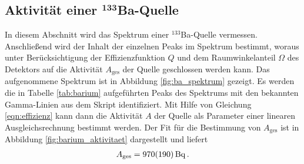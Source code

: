 \subsection[Aktivität einer $^{133}$Ba-Quelle]{Aktivität einer $\mathbf{^{133}}$Ba-Quelle} %
\label{sub:ba_quelle}
In diesem Abschnitt wird das Spektrum einer $^{133}$Ba-Quelle vermessen.
Anschließend wird der Inhalt der einzelnen Peaks im Spektrum bestimmt,
woraus unter Berücksichtigung der Effizienzfunktion $Q$ und dem
Raumwinkelanteil $\Omega$ des Detektors auf die Aktivität $A_\text{ges}$
der Quelle geschlossen werden kann.
Das aufgenommene Spektrum ist in Abbildung \ref{fig:ba_spektrum} gezeigt.
Es werden die in Tabelle \ref{tab:barium} aufgeführten Peaks des Spektrums
mit den bekannten Gamma-Linien aus dem Skript identifiziert.
Mit Hilfe von Gleichung \eqref{eqn:effizienz} kann dann die Aktivität $A$
der Quelle als Parameter einer linearen Ausgleichsrechnung bestimmt werden.
Der Fit für die Bestimmung von $A_\text{ges}$ ist in Abbildung
\ref{fig:barium_aktivitaet} dargestellt und liefert
\begin{align*}
    A_\text{ges} = \SI{970+-190}{\becquerel}\,.
\end{align*}
